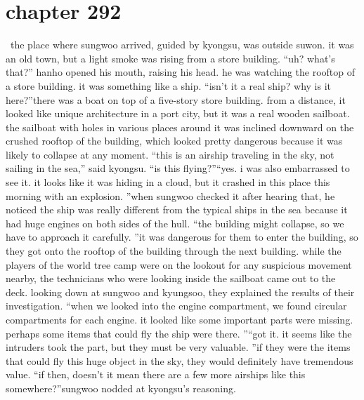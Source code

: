 \section{chapter 292}






 the place where sungwoo arrived, guided by kyongsu, was outside suwon.
 it was an old town, but a light smoke was rising from a store building.
“uh? what’s that?” hanho opened his mouth, raising his head.
 he was watching the rooftop of a store building.
 it was something like a ship.
“isn’t it a real ship? why is it here?”there was a boat on top of a five-story store building.
 from a distance, it looked like unique architecture in a port city, but it was a real wooden sailboat.
the sailboat with holes in various places around it was inclined downward on the crushed rooftop of the building, which looked pretty dangerous because it was likely to collapse at any moment.
“this is an airship traveling in the sky, not sailing in the sea,” said kyongsu.
“is this flying?”“yes.
 i was also embarrassed to see it.
 it looks like it was hiding in a cloud, but it crashed in this place this morning with an explosion.
”when sungwoo checked it after hearing that, he noticed the ship was really different from the typical ships in the sea because it had huge engines on both sides of the hull.
“the building might collapse, so we have to approach it carefully.
”it was dangerous for them to enter the building, so they got onto the rooftop of the building through the next building.
while the players of the world tree camp were on the lookout for any suspicious movement nearby, the technicians who were looking inside the sailboat came out to the deck.
looking down at sungwoo and kyungsoo, they explained the results of their investigation.
“when we looked into the engine compartment, we found circular compartments for each engine.
 it looked like some important parts were missing.
 perhaps some items that could fly the ship were there.
”“got it.
 it seems like the intruders took the part, but they must be very valuable.
”if they were the items that could fly this huge object in the sky, they would definitely have tremendous value.
“if then, doesn’t it mean there are a few more airships like this somewhere?”sungwoo nodded at kyongsu’s reasoning.

